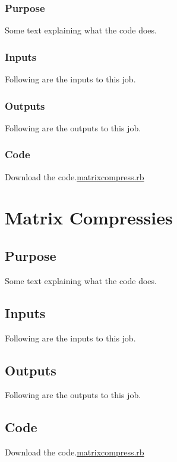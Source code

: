 \documentclass[
  letterpaper,
  DIV=11,
  numbers=noendperiod]{scrreprt}
\begin{document}
\subsection{Purpose}

Some text explaining what the code does.

\subsection{Inputs}

Following are the inputs to this job.

\subsection{Outputs}

Following are the outputs to this job.

\subsection{Code}

Download the code.\href{../first.rb}{matrixcompress.rb}

\chapter{Matrix Compressies}\label{matrix-compressies}

\section{Purpose}

Some text explaining what the code does.

\section{Inputs}

Following are the inputs to this job.

\section{Outputs}

Following are the outputs to this job.

\section{Code}

Download the code.\href{../first.rb}{matrixcompress.rb}
\end{document}
